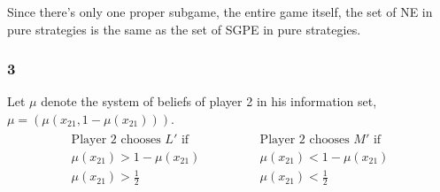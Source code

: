 \documentclass[]{article}
\begin{document}
\begin{figure}[h]
	\centering
\end{figure}

Since there's only one proper subgame, the entire game itself, the set of NE in pure strategies is the same as the set of SGPE in pure strategies.

\subsubsection*{3}

Let $\mu$ denote the system of beliefs of player 2 in his information set, $\mu = (\mu(x_{21}, 1 - \mu(x_{21})))$.
\begin{equation}
	\begin{split}
		\begin{matrix}
			\text{Player 2 chooses }L'\text{ if} \\
			\mu(x_{21}) > 1 - \mu(x_{21}) \\
			\mu(x_{21}) > \frac{1}{2}
		\end{matrix} \qquad\qquad \begin{matrix}
			\text{Player 2 chooses }M'\text{ if} \\
			\mu(x_{21}) < 1 - \mu(x_{21}) \\
			\mu(x_{21}) < \frac{1}{2}
		\end{matrix} \nonumber
	\end{split}
\end{equation}
\end{document}
